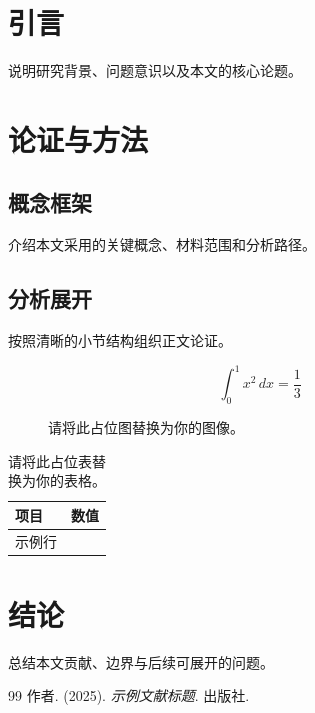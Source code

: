 \documentclass{FUCKJournalCN}
\begin{document}
\makefjtitle

\section{引言}
说明研究背景、问题意识以及本文的核心论题。

\section{论证与方法}
\subsection{概念框架}
介绍本文采用的关键概念、材料范围和分析路径。

\subsection{分析展开}
按照清晰的小节结构组织正文论证。

\begin{equation}
\int_{0}^{1} x^2 \, dx = \frac{1}{3}
\end{equation}

\begin{figure}[htbp]
\centering
\fbox{\rule{0pt}{4cm}\rule{0.8\columnwidth}{0pt}}
\caption{请将此占位图替换为你的图像。}
\label{fig:placeholder}
\end{figure}

\begin{table}[htbp]
\centering
\caption{请将此占位表替换为你的表格。}
\begin{tabularx}{\linewidth}{>{\raggedright\arraybackslash}X>{\raggedleft\arraybackslash}X}
\toprule
项目 & 数值 \\
\midrule
示例行 & 1 \\
\bottomrule
\end{tabularx}
\end{table}

\section{结论}
总结本文贡献、边界与后续可展开的问题。

\begin{thebibliography}{99}
作者. (2025). \textit{示例文献标题}. 出版社.
\end{thebibliography}
\end{document}
